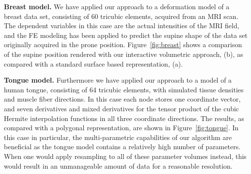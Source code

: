 \documentclass[journal]{vgtc}                %
\begin{document}
\noindent \textbf{Breast model.} We have applied our approach to a deformation model of a breast data set, consisting of 60 tricubic elements, acquired from an MRI scan. The dependent variables in this case are the actual intensities of the MRI field, and the FE modeling has been applied to predict the supine shape of the data set originally acquired in the prone position. Figure~\ref{fig:breast} shows a comparison of the supine position rendered with our interactive volumetric approach, (b), as compared with a standard surface based representation, (a).

\noindent \textbf{Tongue model.} Furthermore we have applied our approach to a model of a human tongue, consisting of 64 tricubic elements, with simulated tissue densities and muscle fiber directions. In this case each node stores one coordinate vector, and seven derivatives and mixed derivatives for the tensor product of the cubic Hermite interpolation functions in all three coordinate directions. The results, as compared with a polygonal representation, are shown in Figure~\ref{fig:tongue}. In this case in particular, the multi-parametric capabilities of our algorithm are beneficial as the tongue model contains a relatively high number of parameters. When one would apply resampling to all of these parameter volumes instead, this would result in an unmanageable amount of data for a reasonable resolution.
\end{document}
